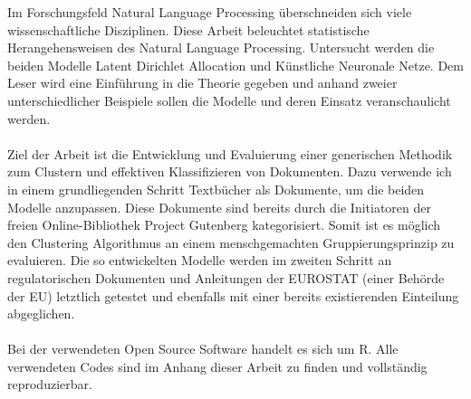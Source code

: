 \documentclass[11pt,a4paper]{article}
\begin{document}
	Im Forschungsfeld Natural Language Processing überschneiden sich viele wissenschaftliche Disziplinen. Diese Arbeit beleuchtet statistische Herangehensweisen des Natural Language Processing. Untersucht werden die beiden Modelle Latent Dirichlet Allocation und Künstliche Neuronale Netze. Dem Leser wird eine Einführung in die Theorie gegeben und anhand zweier unterschiedlicher Beispiele sollen die Modelle und deren Einsatz veranschaulicht werden. \\
	\ \\
	Ziel der Arbeit ist die Entwicklung und Evaluierung einer generischen Methodik zum Clustern und effektiven Klassifizieren von Dokumenten. Dazu verwende ich in einem grundliegenden Schritt Textbücher als Dokumente, um die beiden Modelle anzupassen. Diese Dokumente sind bereits durch die Initiatoren der freien Online-Bibliothek Project Gutenberg kategorisiert. Somit ist es möglich den Clustering Algorithmus an einem menschgemachten Gruppierungsprinzip zu evaluieren. Die so entwickelten Modelle werden im zweiten Schritt an regulatorischen Dokumenten und Anleitungen der EUROSTAT (einer Behörde der EU) letztlich getestet und ebenfalls mit einer bereits existierenden Einteilung abgeglichen. \\
	\ \\
	Bei der verwendeten Open Source Software handelt es sich um R. Alle verwendeten Codes sind im Anhang dieser Arbeit zu finden und vollständig reproduzierbar.
	
\end{document}
